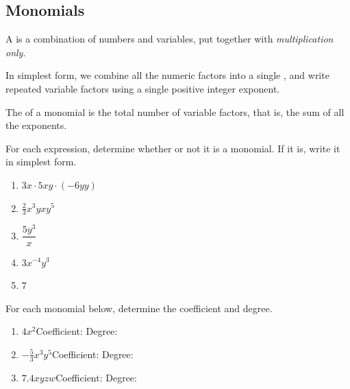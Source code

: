 \subsection{Monomials} 
\begin{definition}[Monomial]
A  is a combination of numbers and variables, put together with \emph{multiplication only}. 

In simplest form, we combine all the numeric factors into a single , and write repeated variable factors using a single positive integer exponent.

The  of a monomial is the total number of variable factors, that is, the sum of all the exponents.
\end{definition}
\begin{Example} For each expression, determine whether or not it is a monomial. If it is, write it in simplest form.
\begin{enumerate}\setabc
\item $3x\cdot 5xy\cdot (-6yy)$\makeblanknewf
\item $\frac{2}{3}x^3yxy^5$\makeblanknewf
\item $\dfrac{5y^3}{x}$\makeblanknewf
\item $3x^{-4}y^3$\makeblanknewf
\item $7$\makeblanknewf
\end{enumerate}
\end{Example}
\begin{Example} For each monomial below, determine the coefficient and degree.
\begin{enumerate}\setabc
\item $4x^2$\lbr Coefficient: \makeblank[0.75in]\hfill Degree: \makeblank[3in]
\item $-\frac{5}{3}x^3y^5$\lbr Coefficient: \makeblank[0.75in]\hfill Degree: \makeblank[3in]
\item $7.4xyzw$\lbr Coefficient: \makeblank[0.75in]\hfill Degree: \makeblank[3in]
\end{enumerate}
\end{Example}